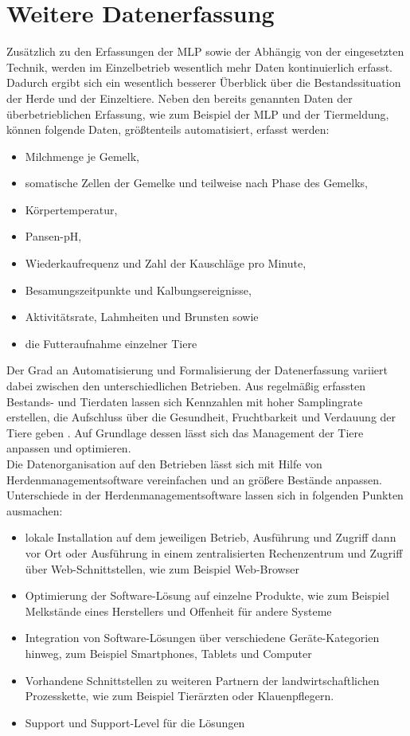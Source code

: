 \section{Weitere Datenerfassung}
Zusätzlich zu den Erfassungen der MLP sowie der Abhängig von der eingesetzten Technik, werden im Einzelbetrieb wesentlich mehr Daten kontinuierlich erfasst. Dadurch ergibt sich ein wesentlich besserer Überblick über die Bestandssituation der Herde und der Einzeltiere. Neben den bereits genannten Daten der überbetrieblichen Erfassung, wie zum Beispiel der MLP und der Tiermeldung, können folgende Daten, größtenteils automatisiert, erfasst werden:
\begin{itemize}
	\item Milchmenge je Gemelk,
	\item somatische Zellen der Gemelke und teilweise nach Phase des Gemelks,
	\item Körpertemperatur,
	\item Pansen-pH,
	\item Wiederkaufrequenz und Zahl der Kauschläge pro Minute,
	\item Besamungszeitpunkte und Kalbungsereignisse,
	\item Aktivitätsrate, Lahmheiten und Brunsten sowie
	\item die Futteraufnahme einzelner Tiere
\end{itemize}
Der Grad an Automatisierung und Formalisierung der Datenerfassung variiert dabei zwischen den unterschiedlichen Betrieben.
Aus regelmäßig erfassten Bestands- und Tierdaten lassen sich Kennzahlen mit hoher Samplingrate erstellen, die Aufschluss über die Gesundheit, Fruchtbarkeit und Verdauung der Tiere geben \autocite[261]{bostedt_fruchtbarkeitsmanagement_2003}. Auf Grundlage dessen lässt sich das Management der Tiere anpassen und optimieren.\\ 
Die Datenorganisation auf den Betrieben lässt sich mit Hilfe von Herdenmanagementsoftware vereinfachen und an größere Bestände anpassen. Unterschiede in der Herdenmanagementsoftware lassen sich in folgenden Punkten ausmachen:
\begin{itemize}
	\item lokale Installation auf dem jeweiligen Betrieb, Ausführung und Zugriff dann vor Ort oder Ausführung in einem zentralisierten Rechenzentrum und Zugriff über Web-Schnittstellen, wie zum Beispiel Web-Browser
	\item Optimierung der Software-Lösung auf einzelne Produkte, wie zum Beispiel Melkstände eines Herstellers und Offenheit für andere Systeme
	\item Integration von Software-Lösungen über verschiedene Geräte-Kategorien hinweg, zum Beispiel Smartphones, Tablets und Computer
	\item Vorhandene Schnittstellen zu weiteren Partnern der landwirtschaftlichen Prozesskette, wie zum Beispiel Tierärzten oder Klauenpflegern.
	\item Support und Support-Level für die Lösungen
\end{itemize}

